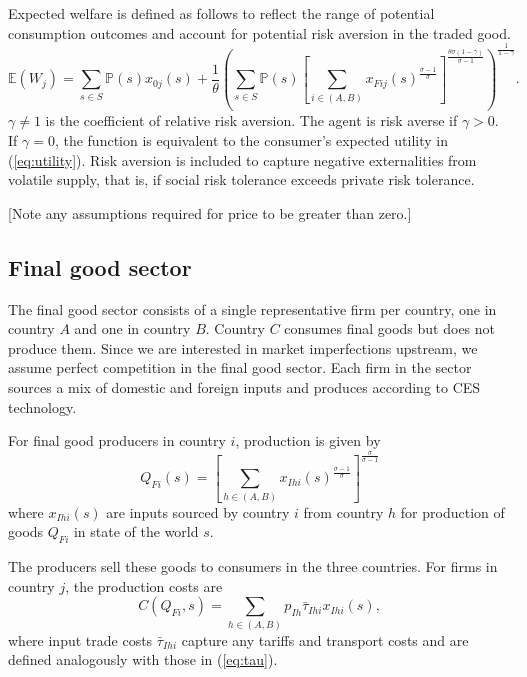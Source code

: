 \documentclass{article}
\begin{document}
Expected welfare is defined as follows to reflect the range of potential consumption outcomes and account for potential risk aversion in the traded good.
\begin{equation} \label{eq:welfare}
    \mathbb{E} \left( W_j \right) = \sum_{s \in S} \mathbb{P}(s) x_{0j}(s) + \frac{1}{\theta} \left( \sum_{s \in S} \mathbb{P}(s) \left[ \sum_{i \in (A, B)} x_{Fij}(s)^{\frac{\sigma - 1}{\sigma}} \right]^{\frac{\theta \sigma (1 - \gamma)}{\sigma - 1}} \right)^{\frac{1}{1 - \gamma}}.
\end{equation}
$\gamma \neq 1$ is the coefficient of relative risk aversion. The agent is risk averse if $\gamma > 0$. If $\gamma = 0$, the function is equivalent to the consumer's expected utility in (\ref{eq:utility}). Risk aversion is included to capture negative externalities from volatile supply, that is, if social risk tolerance exceeds private risk tolerance.

[Note any assumptions required for price to be greater than zero.]

\subsection{Final good sector}

The final good sector consists of a single representative firm per country, one in country $A$ and one in country $B$. Country $C$ consumes final goods but does not produce them. Since we are interested in market imperfections upstream, we assume perfect competition in the final good sector. Each firm in the sector sources a mix of domestic and foreign inputs and produces according to CES technology.

For final good producers in country $i$, production is given by
\begin{equation} \label{eq:prod_final}
    Q_{Fi}(s) = \left[ \sum_{h\in(A,B)} x_{Ihi}(s)^\frac{\sigma-1}{\sigma}  \right]^\frac{\sigma}{\sigma-1}
\end{equation}
where $x_{Ihi}(s)$ are inputs sourced by country $i$ from country $h$ for production of goods $Q_{Fi}$ in state of the world $s$.

The producers sell these goods to consumers in the three countries. For firms in country $j$, the production costs are
\begin{equation*}
    C(Q_{Fi}, s) = \sum_{h\in(A,B)} p_{Ih} \bar{\tau}_{Ihi} x_{Ihi}(s),
\end{equation*}
where input trade costs $\bar{\tau}_{Ihi}$ capture any tariffs and transport costs and are defined analogously with those in (\ref{eq:tau}).
\end{document}

